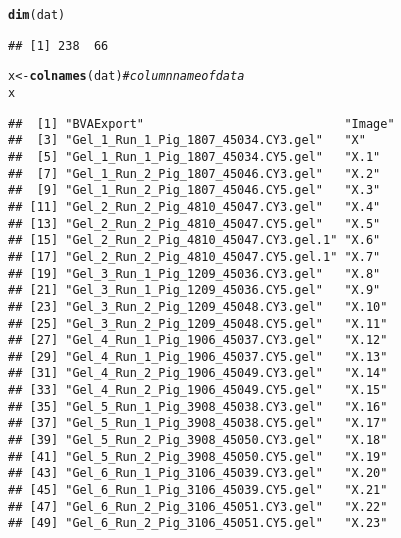 \documentclass{article}\usepackage[]{graphicx}\usepackage[]{color}
\makeatletter
\newcommand{\hlcom}[1]{\textcolor[rgb]{0.678,0.584,0.686}{\textit{#1}}}%
\newcommand{\hlstd}[1]{\textcolor[rgb]{0.345,0.345,0.345}{#1}}%
\newcommand{\hlkwb}[1]{\textcolor[rgb]{0.69,0.353,0.396}{#1}}%
\newcommand{\hlkwd}[1]{\textcolor[rgb]{0.737,0.353,0.396}{\textbf{#1}}}%
\newenvironment{kframe}{%
 \def\at@end@of@kframe{}%
 \ifinner\ifhmode%
  \def\at@end@of@kframe{\end{minipage}}%
  \begin{minipage}{\columnwidth}%
 \fi\fi%
 \def\FrameCommand##1{\hskip\@totalleftmargin \hskip-\fboxsep
 \colorbox{shadecolor}{##1}\hskip-\fboxsep
     \hskip-\linewidth \hskip-\@totalleftmargin \hskip\columnwidth}%
 \MakeFramed {\advance\hsize-\width
   \@totalleftmargin\z@ \linewidth\hsize
   \@setminipage}}%
 {\par\unskip\endMakeFramed%
 \at@end@of@kframe}
\newenvironment{knitrout}{}{} %
\makeatother
\begin{document}
\begin{knitrout}
\begin{kframe}
\begin{alltt}
\hlkwd{dim}\hlstd{(dat)}
\end{alltt}
\begin{verbatim}
## [1] 238  66
\end{verbatim}
\begin{alltt}
\hlstd{x} \hlkwb{<-} \hlkwd{colnames}\hlstd{(dat)}  \hlcom{# column name of data}
\hlstd{x}
\end{alltt}
\begin{verbatim}
##  [1] "BVAExport"                            "Image"                               
##  [3] "Gel_1_Run_1_Pig_1807_45034.CY3.gel"   "X"                                   
##  [5] "Gel_1_Run_1_Pig_1807_45034.CY5.gel"   "X.1"                                 
##  [7] "Gel_1_Run_2_Pig_1807_45046.CY3.gel"   "X.2"                                 
##  [9] "Gel_1_Run_2_Pig_1807_45046.CY5.gel"   "X.3"                                 
## [11] "Gel_2_Run_2_Pig_4810_45047.CY3.gel"   "X.4"                                 
## [13] "Gel_2_Run_2_Pig_4810_45047.CY5.gel"   "X.5"                                 
## [15] "Gel_2_Run_2_Pig_4810_45047.CY3.gel.1" "X.6"                                 
## [17] "Gel_2_Run_2_Pig_4810_45047.CY5.gel.1" "X.7"                                 
## [19] "Gel_3_Run_1_Pig_1209_45036.CY3.gel"   "X.8"                                 
## [21] "Gel_3_Run_1_Pig_1209_45036.CY5.gel"   "X.9"                                 
## [23] "Gel_3_Run_2_Pig_1209_45048.CY3.gel"   "X.10"                                
## [25] "Gel_3_Run_2_Pig_1209_45048.CY5.gel"   "X.11"                                
## [27] "Gel_4_Run_1_Pig_1906_45037.CY3.gel"   "X.12"                                
## [29] "Gel_4_Run_1_Pig_1906_45037.CY5.gel"   "X.13"                                
## [31] "Gel_4_Run_2_Pig_1906_45049.CY3.gel"   "X.14"                                
## [33] "Gel_4_Run_2_Pig_1906_45049.CY5.gel"   "X.15"                                
## [35] "Gel_5_Run_1_Pig_3908_45038.CY3.gel"   "X.16"                                
## [37] "Gel_5_Run_1_Pig_3908_45038.CY5.gel"   "X.17"                                
## [39] "Gel_5_Run_2_Pig_3908_45050.CY3.gel"   "X.18"                                
## [41] "Gel_5_Run_2_Pig_3908_45050.CY5.gel"   "X.19"                                
## [43] "Gel_6_Run_1_Pig_3106_45039.CY3.gel"   "X.20"                                
## [45] "Gel_6_Run_1_Pig_3106_45039.CY5.gel"   "X.21"                                
## [47] "Gel_6_Run_2_Pig_3106_45051.CY3.gel"   "X.22"                                
## [49] "Gel_6_Run_2_Pig_3106_45051.CY5.gel"   "X.23"                                

\end{verbatim}
\end{kframe}
\end{knitrout}
\end{document}
